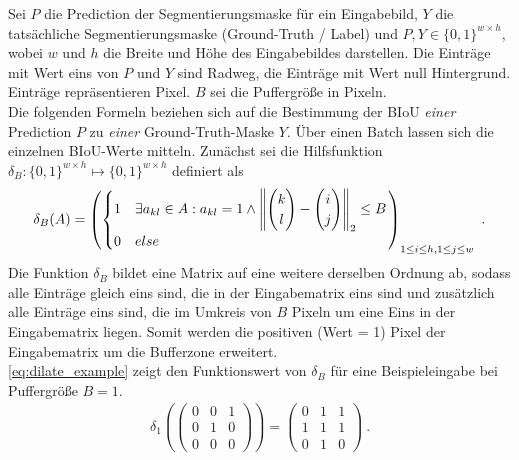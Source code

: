 Sei $P$ die Prediction der Segmentierungsmaske für ein Eingabebild, $Y$ die tatsächliche Segmentierungsmaske (Ground-Truth / Label)
und $P, Y \in \{0, 1\}^{w{\times}h}$, wobei $w$ und $h$ die Breite und Höhe des Eingabebildes darstellen.
Die Einträge mit Wert eins von $P$ und $Y$ sind Radweg, die Einträge mit Wert null Hintergrund. Einträge repräsentieren Pixel.
$B$ sei die Puffergröße in Pixeln. \\
Die folgenden Formeln beziehen sich auf die Bestimmung der \ac{BIoU} \textit{einer} Prediction $P$ zu \textit{einer} Ground-Truth-Maske $Y$. 
Über einen Batch lassen sich die einzelnen \ac{BIoU}-Werte mitteln. 
Zunächst sei die Hilfsfunktion $\delta_B: \{0,1\}^{w{\times}h} \mapsto \{0,1\}^{w{\times}h}$ definiert als 
\begin{align}
	\label{eq:dilate} \delta_B(A) = \left( \begin{cases} 
		1 & \exists a_{kl} \in A: a_{kl} = 1 \land \left\lVert
			\begin{pmatrix} k \\ l \end{pmatrix} - \begin{pmatrix} i \\ j \end{pmatrix} \right\rVert_2 \leq B \\
		0 & else 
	\end{cases} \right)_{1 \leq i \leq h, 1 \leq j \leq w}~.
\end{align}
Die Funktion $\delta_B$ bildet eine Matrix auf eine weitere derselben Ordnung ab, 
sodass alle Einträge gleich eins sind, die in der Eingabematrix eins sind und zusätzlich alle Einträge eins sind, 
die im Umkreis von $B$ Pixeln um eine Eins in der Eingabematrix liegen. Somit werden die positiven (Wert = 1)
Pixel der Eingabematrix um die Bufferzone erweitert.  \\
\autoref{eq:dilate_example} zeigt den Funktionswert von $\delta_B$ für eine Beispieleingabe 
bei Puffergröße $B=1$.
\begin{align}
	\label{eq:dilate_example} \delta_1\left(\begin{pmatrix} 
	0 & 0 & 1 \\ 
	0 & 1 & 0 \\ 
	0 & 0 & 0 
	\end{pmatrix}\right) = \begin{pmatrix} 
	0 & 1 & 1 \\ 
	1 & 1 & 1 \\ 
	0 & 1 & 0 
	\end{pmatrix}~.
\end{align}
